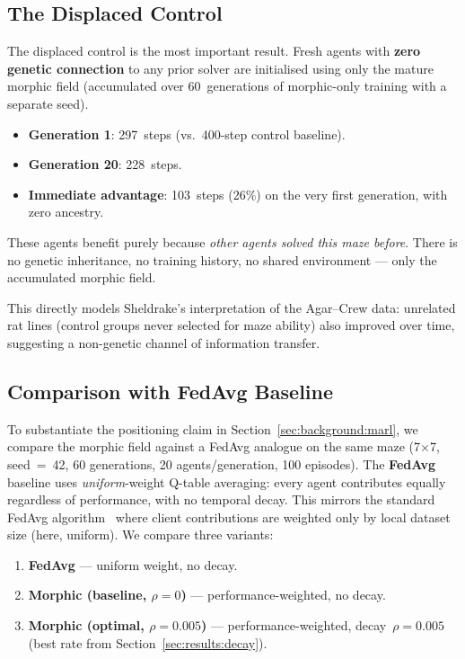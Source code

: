 \documentclass[twoside,11pt]{article}
\begin{document}
\subsection{The Displaced Control}
\label{sec:results:displaced}

The displaced control is the most important result.  Fresh agents with
\textbf{zero genetic connection} to any prior solver are initialised using
only the mature morphic field (accumulated over 60~generations of morphic-only
training with a separate seed).

\begin{itemize}[leftmargin=2em]
    \item \textbf{Generation 1}: 297~steps (vs.\ 400-step control baseline).
    \item \textbf{Generation 20}: 228~steps.
    \item \textbf{Immediate advantage}: 103~steps (26\%) on the very first
          generation, with zero ancestry.
\end{itemize}

These agents benefit purely because \emph{other agents solved this maze
before}.  There is no genetic inheritance, no training history, no shared
environment --- only the accumulated morphic field.

This directly models Sheldrake's interpretation of the Agar--Crew data:
unrelated rat lines (control groups never selected for maze ability) also
improved over time, suggesting a non-genetic channel of information transfer.

\subsection{Comparison with FedAvg Baseline}
\label{sec:results:fedavg}

To substantiate the positioning claim in Section~\ref{sec:background:marl},
we compare the morphic field against a FedAvg analogue on the same maze
(7$\times$7, seed~=~42, 60 generations, 20 agents/generation, 100 episodes).
The \textbf{FedAvg} baseline uses \emph{uniform}-weight Q-table averaging:
every agent contributes equally regardless of performance, with no temporal
decay.  This mirrors the standard FedAvg algorithm~\citep{mcmahan2017} where
client contributions are weighted only by local dataset size (here, uniform).
We compare three variants:

\begin{enumerate}[leftmargin=2em]
    \item \textbf{FedAvg} --- uniform weight, no decay.
    \item \textbf{Morphic (baseline, $\rho = 0$)} --- performance-weighted,
          no decay.
    \item \textbf{Morphic (optimal, $\rho = 0.005$)} --- performance-weighted,
          decay~$\rho = 0.005$ (best rate from Section~\ref{sec:results:decay}).
\end{enumerate}
\end{document}
